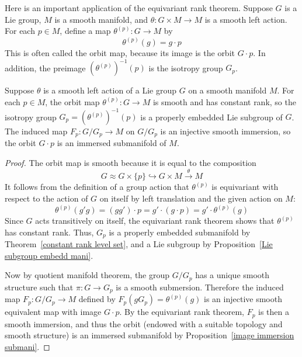 Here is an important application of the equivariant rank theorem. Suppose $G$ is a Lie group, $M$ is a smooth manifold, and $\theta:G\times M\to M$ is a smooth left action. For each $p\in M$, define a map $\theta^{(p)}:G\to M$ by
\[\theta^{(p)}(g)=g\cdot p\]
This is often called the orbit map, because its image is the orbit $G\cdot p$. In addition, the preimage $(\theta^{(p)})^{-1}(p)$ is the isotropy group $G_p$.
\begin{proposition}\label{orbit map prop}
Suppose $\theta$ is a smooth left action of a Lie group $G$ on a smooth manifold $M$. For each $p\in M$, the orbit map $\theta^{(p)}:G\to M$ is smooth and has constant rank, so the isotropy group $G_p=(\theta^{(p)})^{-1}(p)$ is a properly embedded Lie subgroup of $G$. The induced map $F_p:G/G_p\to M$ on $G/G_p$ is an injective smooth immersion, so the orbit $G\cdot p$ is an immersed submanifold of $M$.
\end{proposition}
\begin{proof}
The orbit map is smooth because it is equal to the composition
\[G\approx G\times\{p\}\hookrightarrow G\times M\stackrel{\theta}{\to}M\]
It follows from the definition of a group action that $\theta^{(p)}$ is equivariant with respect to the action of $G$ on itself by left translation and the given action on $M$:
\[\theta^{(p)}(g'g)=(gg')\cdot p=g'\cdot(g\cdot p)=g'\cdot\theta^{(p)}(g)\]
Since $G$ acts transitively on itself, the equivariant rank theorem shows that $\theta^{(p)}$ has constant rank. Thus, $G_p$ is a properly embedded submanifold by Theorem~\ref{constant rank level set}, and a Lie subgroup by Proposition~\ref{Lie subgroup embedd mani}.\par
Now by quotient manifold theorem, the group $G/G_p$ has a unique smooth structure such that $\pi:G\to G_p$ is a smooth submersion. Therefore the induced map $F_p:G/G_p\to M$ defined by $F_p(gG_p)=\theta^{(p)}(g)$ is an injective smooth equivalent map with image $G\cdot p$. By the equivariant rank theorem, $F_p$ is then a smooth immersion, and thus the orbit (endowed with a suitable topology and smooth structure) is an immersed submanifold by Proposition~\ref{image immersion submani}.
\end{proof}
